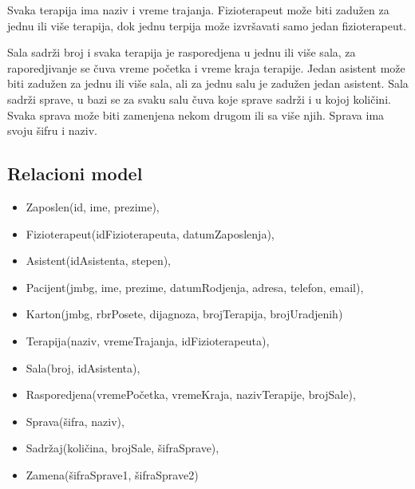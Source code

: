 \documentclass{article}
\begin{document}
Svaka terapija ima naziv i vreme trajanja. Fizioterapeut može biti zadužen za jednu ili više terapija, dok jednu terpija može izvršavati samo jedan fizioterapeut.

Sala sadrži broj i svaka terapija je rasporedjena u jednu ili više sala, za raporedjivanje se čuva vreme početka i vreme kraja terapije. Jedan asistent može biti zadužen za jednu ili više sala, ali za jednu salu je zadužen jedan asistent. Sala sadrži sprave, u bazi se za svaku salu čuva koje sprave sadrži i u kojoj količini. Svaka sprava može biti zamenjena nekom drugom ili sa više njih. Sprava ima svoju šifru i naziv.

\subsection{Relacioni model}
\begin{itemize} 
	\item Zaposlen(id, ime, prezime),
	\item Fizioterapeut(idFizioterapeuta, datumZaposlenja),
	\item Asistent(idAsistenta, stepen),
	\item Pacijent(jmbg, ime, prezime, datumRodjenja, adresa, telefon, email),
	\item Karton(jmbg, rbrPosete, dijagnoza, brojTerapija, brojUradjenih)
	\item Terapija(naziv, vremeTrajanja, idFizioterapeuta),
	\item Sala(broj, idAsistenta),
	\item Rasporedjena(vremePočetka, vremeKraja, nazivTerapije, brojSale),
	\item Sprava(šifra, naziv),
	\item Sadržaj(količina, brojSale, šifraSprave),
	\item Zamena(šifraSprave1, šifraSprave2)
\end{itemize}
\end{document}
